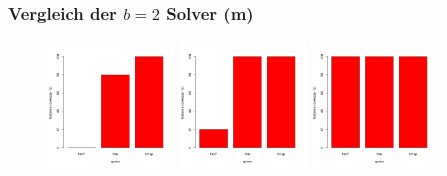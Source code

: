 \documentclass{beamer}
\begin{document}
\begin{frame}
\frametitle{Vergleich der $b = 2$ Solver (m)}

\begin{figure}
\centering
\includegraphics[width=0.3\textwidth]{images/solver_instance_coverage_b=2_m_60s.png}
\includegraphics[width=0.3\textwidth]{images/solver_instance_coverage_b=2_m_600s.png}
\includegraphics[width=0.3\textwidth]{images/solver_instance_coverage_b=2_m_1200s.png}
\caption*{\textsc{Zeitlimit 1min} $\quad\quad\quad$ \textsc{Zeitlimit 10min} $\quad\quad\quad$ \textsc{Zeitlimit 20min}}
\begin{subfigure}[b]{0.3\textwidth}
\centering
{}
\end{subfigure}
\end{figure}
\end{frame}
\end{document}
